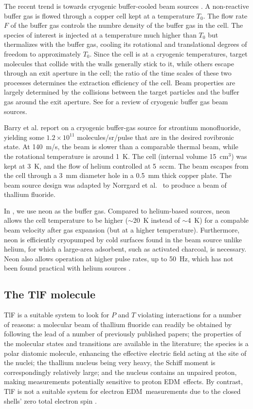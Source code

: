 The recent trend is towards cryogenic buffer-cooled beam sources
\cite{hutzler2012buffer}. A non-reactive buffer gas is flowed through a copper
cell kept at a temperature $T_0$. The flow rate $F$ of the buffer gas controls
the numbre density of the buffer gas in the cell. The species of interest is
injected at a temperature much higher than $T_0$ but thermalizes with the buffer
gas, cooling its rotational and translational degrees of freedom to
approximately $T_0$. Since the cell is at a cryogenic temperatures, target
molecules that collide with the walls generally stick to it, while others escape
through an exit aperture in the cell; the ratio of the time scales of these two
processes determines the extraction efficiency of the cell. Beam properties are
largely determined by the collisions between the target particles and the buffer
gas around the exit aperture. See \cite{hutzler2012buffer} for a review of
cryogenic buffer gas beam sources.

Barry et al. \cite{barry2011bright} report on a cryogenic buffer-gas source for
strontium monofluoride, yielding some $1.2\times10^{11}$ molecules/sr/pulse that
are in the desired rovibronic state. At 140~m/s, the beam is slower than a
comparable thermal beam, while the rotational temperature is around 1~K. The
cell (internal volume 15~cm$^3$) was kept at 3~K, and the flow of helium
controlled at 5~sccm. The beam escapes from the cell through a 3~mm diameter
hole in a 0.5~mm thick copper plate. The beam source design was adapted by
Norrgard et al.\ \cite{norrgard2017hyperfine} to produce a beam of thallium
fluoride.

In \CENTREX, we use neon as the buffer gas. Compared to helium-based sources,
neon allows the cell temperature to be higher ($\sim$20~K instead of $\sim$4~K)
for a compable beam velocity after gas expansion (but at a higher temperature).
Furthermore, neon is efficiently cryopumped by cold surfaces found in the beam
source unlike helium, for which a large-area adsorbent, such as activated
charcoal, is necessary. Neon also allows operation at higher pulse
rates, up to 50~Hz, which has not been found practical with helium
sources \cite{hutzler2012buffer}.

\subsection{The TlF molecule}

TlF is a suitable system to look for $P$ and $T$ violating interactions for a
number of reasons: a molecular beam of thallium fluoride can readily be obtained
by following the lead of a number of previously published papers; the properties
of the molecular states and transitions are available in the literature; the
species is a polar diatomic molecule, enhancing the effective electric field
acting at the site of the nuclei; the thallium nucleus being very heavy, the
Schiff moment is correspondingly relatively large; and the nucleus contains an
unpaired proton, making measurements potentially sensitive to proton \gls{EDM}\
effects. \cite{sandars1967measurability, wilkening1984search} By contrast, TlF
is not a suitable system for electron \gls{EDM}\ measurements due to the closed
shells' zero total electron spin \cite{kozlov1995parity}.

